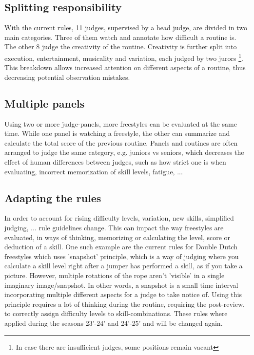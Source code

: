 \subsection{Splitting responsibility}
With the current rules, 11 judges, supervised by a head judge, are divided in two main categories. Three of them watch and annotate how difficult a routine is. The other 8 judge the creativity of the routine. Creativity is further split into execution, entertainment, musicality and variation, each judged by two jurors \footnote{In case there are insufficient judges, some positions remain vacant}. This breakdown allows increased attention on different aspects of a routine, thus decreasing potential observation mistakes.

\subsection{Multiple panels}
Using two or more judge-panels, more freestyles can be evaluated at the same time. While one panel is watching a freestyle, the other can summarize and calculate the total score of the previous routine. Panels and routines are often arranged to judge the same category, e.g. juniors vs seniors, which decreases the effect of human differences between judges, such as how strict one is when evaluating, incorrect memorization of skill levels, fatigue, ...

\subsection{Adapting the rules}
In order to account for rising difficulty levels, variation, new skills, simplified judging, ... rule guidelines change. This can impact the way freestyles are evaluated, in ways of thinking, memorizing or calculating the level, score or deduction of a skill. One such example are the current rules for Double Dutch freestyles which uses 'snapshot' principle, which is a way of judging where you calculate a skill level right after a jumper has performed a skill, as if you take a picture. However, multiple rotations of the rope aren't 'visible' in a single imaginary image/snapshot. In other words, a snapshot is a small time interval incorporating multiple different aspects for a judge to take notice of. Using this principle requires a lot of thinking during the routine, requiring the post-review, to correctly assign difficulty levels to skill-combinations. These rules where applied during the seasons 23'-24' and 24'-25' and will be changed again.

